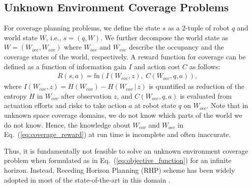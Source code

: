 \documentclass[letterpaper]{article} %
\newcommand{\phdone}[1]{} %
\begin{document}
\subsection{Unknown Environment Coverage Problems}

\phdone{Coverage Problem}
For coverage planning problems, we define the state $s$ as a 2-tuple of robot $q$ and world state $W$, i.e., $s = (q, W)$.
We further decompose the world state as $W = (W_{occ}, W_{cov})$ where $W_{occ}$ and $W_{cov}$ describe the occupancy and the coverage states of the world, respectively.
%
A reward function for coverage can be defined as a function of information gain $I$ and action cost $C$ as follows:
\begin{align}
  R(s, a) = \mathrm{fn}(I(W_{cov}, z),\; C(W_{occ}, q, a)),
  \label{eq:coverage_reward}
\end{align}
where $I(W_{cov}, z) = H(W_{cov}) - H(W_{cov} \,|\, z)$ is quantified as reduction of the entropy $H$ in $W_{cov}$ after observation $z$,  %
and $C(W_{occ}, q, a)$ is evaluated from actuation efforts and risks to take action $a$ at robot state $q$ on $W_{occ}$.
Note that in unknown space coverage domains, we do not know which parts of the world we do not know. Hence, the knowledge about $W_{cov}$ and $W_{occ}$ in Eq.~(\ref{eq:coverage_reward}) at run time is incomplete and often inaccurate.

\phdone{Receding Horizon Planning}
%
Thus, it is fundamentally not feasible to solve an unknown environment coverage problem when formulated as in Eq.~(\ref{eq:objective_function}) for an infinite horizon.
Instead, Receding Horizon Planning (RHP) scheme has been widely adopted in most of the state-of-the-art in this domain \cite{bircher2016receding}.
\end{document}
